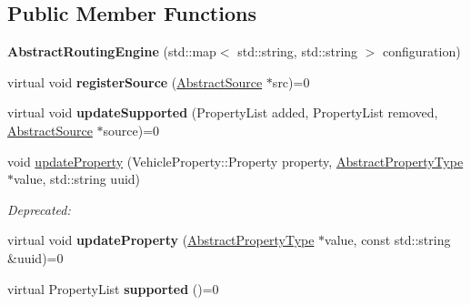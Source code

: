 \subsection*{Public Member Functions}
\begin{DoxyCompactItemize}
\item 
\hypertarget{classAbstractRoutingEngine_a60ef59d81671e74ecc1ba3e926157a7f}{{\bfseries Abstract\-Routing\-Engine} (std\-::map$<$ std\-::string, std\-::string $>$ configuration)}\label{classAbstractRoutingEngine_a60ef59d81671e74ecc1ba3e926157a7f}

\item 
\hypertarget{classAbstractRoutingEngine_ad88ea00def2bb5991f5b2b424acab6c8}{virtual void {\bfseries register\-Source} (\hyperlink{classAbstractSource}{Abstract\-Source} $\ast$src)=0}\label{classAbstractRoutingEngine_ad88ea00def2bb5991f5b2b424acab6c8}

\item 
\hypertarget{classAbstractRoutingEngine_a177588ad6d45f477f596eb025dcc8bed}{virtual void {\bfseries update\-Supported} (Property\-List added, Property\-List removed, \hyperlink{classAbstractSource}{Abstract\-Source} $\ast$source)=0}\label{classAbstractRoutingEngine_a177588ad6d45f477f596eb025dcc8bed}

\item 
\hypertarget{classAbstractRoutingEngine_adadf5f60f3895bdb90bb224d05ee97f0}{void \hyperlink{classAbstractRoutingEngine_adadf5f60f3895bdb90bb224d05ee97f0}{update\-Property} (Vehicle\-Property\-::\-Property property, \hyperlink{classAbstractPropertyType}{Abstract\-Property\-Type} $\ast$value, std\-::string uuid)}\label{classAbstractRoutingEngine_adadf5f60f3895bdb90bb224d05ee97f0}

\begin{DoxyCompactList}\small\item\em Deprecated\-: \end{DoxyCompactList}\item 
\hypertarget{classAbstractRoutingEngine_a2395e520ddfd532959706a5122998fbb}{virtual void {\bfseries update\-Property} (\hyperlink{classAbstractPropertyType}{Abstract\-Property\-Type} $\ast$value, const std\-::string \&uuid)=0}\label{classAbstractRoutingEngine_a2395e520ddfd532959706a5122998fbb}

\item 
\hypertarget{classAbstractRoutingEngine_adcd80e2e3823af7101c5d1f7ff0c217c}{virtual Property\-List {\bfseries supported} ()=0}\label{classAbstractRoutingEngine_adcd80e2e3823af7101c5d1f7ff0c217c}


\end{DoxyCompactItemize}
